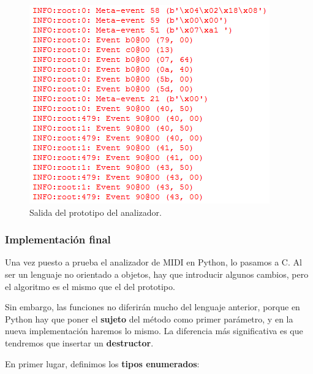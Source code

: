 \begin{figure}[H]
	\noindent \begin{centering}
		\includegraphics[width=\linewidth*2/3]{capitulo5/cap_parser}
		\par\end{centering}
	\smallskip
	\caption{\label{fig:cap_parser} Salida del prototipo del analizador.}
\end{figure}

\smallskip

\subsubsection{Implementación final}

Una vez puesto a prueba el analizador de \acrshort{MIDI} en Python, lo pasamos a C. Al ser un lenguaje no orientado a objetos, hay que introducir algunos cambios, pero el algoritmo es el mismo que el del prototipo. 

Sin embargo, las funciones no diferirán mucho del lenguaje anterior, porque en Python hay que poner el \textbf{sujeto} del método como primer parámetro, y en la nueva implementación haremos lo mismo. La diferencia más significativa es que tendremos que insertar un \textbf{destructor}.

En primer lugar, definimos los \textbf{tipos enumerados}:

